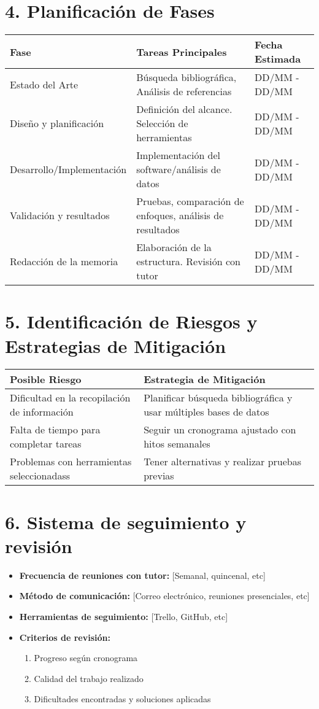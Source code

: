 \documentclass[12pt, a4paper]{article}
\begin{document}
\section*{4. Planificación de Fases}
\begin{tabularx}{\textwidth}{|l|X|l|}
    \hline
    \textbf{Fase} & \textbf{Tareas Principales} & \textbf{Fecha Estimada} \\ \hline
    Estado del Arte & Búsqueda bibliográfica, Análisis de referencias & DD/MM - DD/MM \\ \hline
    Diseño y planificación & Definición del alcance. Selección de herramientas & DD/MM - DD/MM \\ \hline
    Desarrollo/Implementación & Implementación del software/análisis de datos & DD/MM - DD/MM \\ \hline
    Validación y resultados & Pruebas, comparación de enfoques, análisis de resultados & DD/MM - DD/MM \\ \hline
    Redacción de la memoria & Elaboración de la estructura. Revisión con tutor & DD/MM - DD/MM \\ \hline
\end{tabularx}

\section*{5. Identificación de Riesgos y Estrategias de Mitigación}
\begin{tabularx}{\textwidth}{|l|X|}
    \hline
    \textbf{Posible Riesgo} & \textbf{Estrategia de Mitigación} \\ \hline
    Dificultad en la recopilación de información & Planificar búsqueda bibliográfica y usar múltiples bases de datos \\ \hline
    Falta de tiempo para completar tareas & Seguir un cronograma ajustado con hitos semanales \\ \hline
    Problemas con herramientas seleccionadass & Tener alternativas y realizar pruebas previas \\ \hline
\end{tabularx}

\section*{6. Sistema de seguimiento y revisión}
\begin{itemize}
    \item \textbf{Frecuencia de reuniones con tutor:} [Semanal, quincenal, etc]
    \item \textbf{Método de comunicación:} [Correo electrónico, reuniones presenciales, etc]
    \item \textbf{Herramientas de seguimiento:} [Trello, GitHub, etc]
    \item \textbf{Criterios de revisión:}
    \begin{enumerate}
        \item Progreso según cronograma
        \item Calidad del trabajo realizado
        \item Dificultades encontradas y soluciones aplicadas
    \end{enumerate}
\end{itemize}
\end{document}
